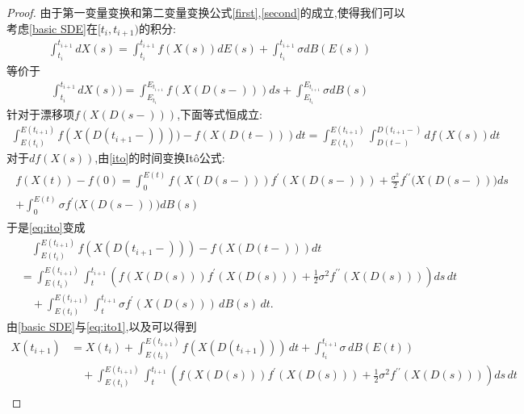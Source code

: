 \begin{proof}
	由于第一变量变换和第二变量变换公式\cref{first},\cref{second}的成立,使得我们可以考虑\cref{basic SDE}在$[t_i,t_{i+1})$的积分:
	\begin{align}
		\int_{t_i}^{t_{i+1}}dX(s)=\int_{t_i}^{t_{i+1}}f(X(s))dE(s)+\int_{t_i}^{t_{i+1}}\sigma dB(E(s))
	\end{align}
	等价于
	\begin{align}
		\int_{t_i}^{t_{i+1}}dX(s))=\int_{E_{t_i}}^{E_{t_{i+1}}}f(X(D(s-)))ds+\int_{E_{t_i}}^{E_{t_{i+1}}}\sigma dB(s)
	\end{align}
	针对于漂移项$f(X(D(s-)))$,下面等式恒成立:
	\begin{align}\label{eq:ito}
		\int_{E(t_i)}^{E(t_{i+1})} f(X(D(t_{i+1}-)))) - f(X(D(t-))) dt = \int_{E(t_i)}^{E(t_{i+1})} \int^{D(t_{i+1}-)}_{D(t-)} df(X(s)) dt
	\end{align}
	对于$df(X(s))$,由\cref{ito}的时间变换It\^{o}公式:
	\begin{align*}
		\begin{gathered}
			f(X(t))-f(0)=\int_{0}^{E(t)}f(X(D(s-)))f^{\prime}\left(X(D(s-))\right)+\frac{\sigma^{2}}{2}f^{\prime\prime}\big(X(D(s-))\big)ds \\
			+\int_{0}^{E(t)}\sigma f^{\prime}\big(X(D(s-))\big)dB(s)
		\end{gathered}
	\end{align*}
	于是\cref{eq:ito}变成
	\begin{equation}\label{eq:ito1}
		\begin{aligned}
			&\quad\int_{E(t_i)}^{E(t_{i+1})} f(X(D(t_{i+1}-))) - f(X(D(t-))) dt \\
			&= \int_{E(t_i)}^{E(t_{i+1})} \int_{t}^{t_{i+1}} \left( f(X(D(s))) f^{\prime}(X(D(s))) + \frac{1}{2} \sigma^2 f^{\prime\prime}(X(D(s))) \right) ds \, dt\\
			&\quad + \int_{E(t_i)}^{E(t_{i+1})} \int_{t}^{t_{i+1}} \sigma f^{\prime}(X(D(s))) \, dB(s) \, dt .
		\end{aligned}
	\end{equation}
	由\cref{basic SDE}与\cref{eq:ito1},以及\cite[Theorem 3.1]{kobayashi2011stochastic}可以得到
	\begin{align*}
		X(t_{i+1}) 
		&= X(t_i) + \int_{E(t_i)}^{E(t_{i+1})} f(X({D(t_{i+1})})) \, dt + \int_{t_i}^{t_{i+1}} \sigma \, dB(E(t)) \\
		&\quad + \int_{E(t_i)}^{E(t_{i+1})} \int_{t}^{t_{i+1}}\left( f(X(D(s))) f^{\prime}(X(D(s))) + \frac{1}{2} \sigma^2 f^{\prime\prime}(X(D(s))) \right) ds \, dt \\

\end{align*}
\end{proof}
